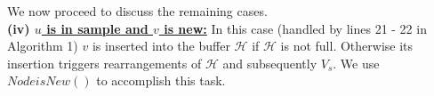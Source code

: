 We now proceed to discuss the remaining cases. \\
\noindent\textbf{(iv) \underline{$u$ is in sample and $v$ is new:}}
In this case (handled by lines 21 - 22 in Algorithm 1) $v$ is inserted into the buffer $\mathcal{H}$ if $\mathcal{H}$ is not full. Otherwise its insertion triggers rearrangements of $\mathcal{H}$ and subsequently $V_s$. We use $NodeisNew()$ to accomplish this task. 


